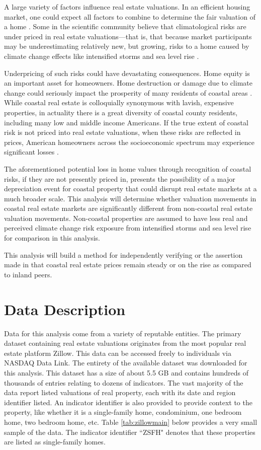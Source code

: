 \documentclass[12pt]{article}
\begin{document}
A large variety of factors influence real estate valuations. In an efficient housing market, one could expect all factors to combine to determine the fair valuation of a home \citep{maier2009real}. Some in the scientific community believe that climatological risks are under priced in real estate valuations---that is, that because market participants may be underestimating relatively new, but growing, risks to a home caused by climate change effects like intensified storms and sea level rise \citep{McNamara2024}. 

Underpricing of such risks could have devastating consequences. Home equity is an important asset for homeowners. Home destruction or damage due to climate change could seriously impact the prosperity of many residents of coastal areas \citep{fussell2014homeownership}. While coastal real estate is colloquially synonymous with lavish, expensive properties, in actuality there is a great diversity of coastal county residents, including many low and middle income Americans. If the true extent of coastal risk is not priced into real estate valuations, when these risks are reflected in prices, American homeowners across the socioeconomic spectrum may experience significant losses \citep{McNamara2024}.

The aforementioned potential loss in home values through recognition of coastal risks, if they are not presently priced in, presents the possibility of a major depreciation event for coastal property that could disrupt real estate markets at a much broader scale. This analysis will determine whether valuation movements in coastal real estate markets are significantly different from non-coastal real estate valuation movements. Non-coastal properties are assumed to have less real and perceived climate change risk exposure from intensified storms and sea level rise for comparison in this analysis. 

This analysis will build a method for independently verifying or the assertion made in \citet{McNamara2024} that coastal real estate prices remain steady or on the rise as compared to inland peers.

\section{Data Description}
\label{sec:data}

Data for this analysis come from a variety of reputable entities. The primary dataset containing real estate valuations originates from the most popular real estate platform Zillow. This data can be accessed freely to individuals via NASDAQ Data Link. The entirety of the available dataset was downloaded for this analysis. This dataset has a size of about 5.5 GB and contains hundreds of thousands of entries relating to dozens of indicators. The vast majority of the data report listed valuations of real property, each with its date and region identifier listed. An indicator identifier is also provided to provide context to the property, like whether it is a single-family home, condominium, one bedroom home, two bedroom home, etc. Table \ref{tab:zillowmain} below provides a very small sample of the data. The indicator identifier ``ZSFH" denotes that these properties are listed as single-family homes.
\end{document}
